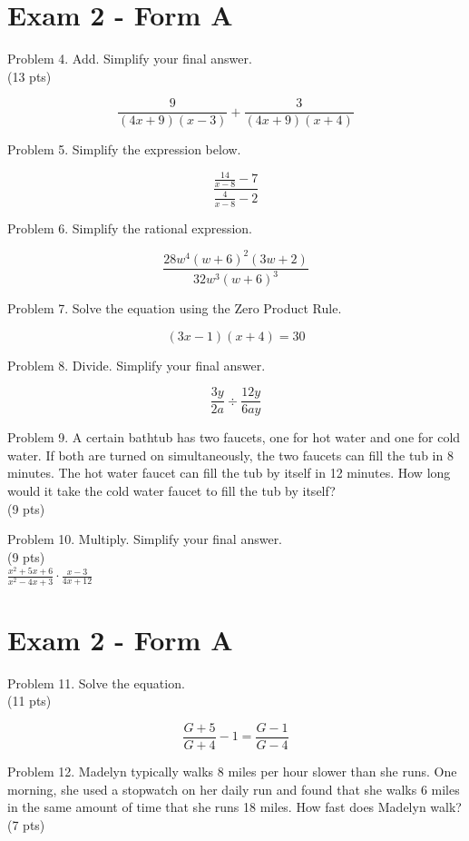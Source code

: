 \documentclass{ximera}
\begin{document}
\section*{Exam 2 - Form A}
Problem 4. Add. Simplify your final answer.\\
(13 pts)

$$\frac{9}{(4 x+9)(x-3)}+\frac{3}{(4 x+9)(x+4)}$$

Problem 5. Simplify the expression below.

$$\frac{\frac{14}{x-8}-7}{\frac{4}{x-8}-2}$$

Problem 6. Simplify the rational expression.

$$\frac{28 w^{4}(w+6)^{2}(3 w+2)}{32 w^{3}(w+6)^{3}}$$

Problem 7. Solve the equation using the Zero Product Rule.

$$(3 x-1)(x+4)=30$$

Problem 8. Divide. Simplify your final answer.

$$\frac{3 y}{2 a} \div \frac{12 y}{6 a y}$$

Problem 9. A certain bathtub has two faucets, one for hot water and one for cold water. If both are turned on simultaneously, the two faucets can fill the tub in 8 minutes. The hot water faucet can fill the tub by itself in 12 minutes. How long would it take the cold water faucet to fill the tub by itself?\\
(9 pts)

Problem 10. Multiply. Simplify your final answer.\\
(9 pts)\\
$\frac{x^{2}+5 x+6}{x^{2}-4 x+3} \cdot \frac{x-3}{4 x+12}$

\section*{Exam 2 - Form A}
Problem 11. Solve the equation.\\
(11 pts)

$$\frac{G+5}{G+4}-1=\frac{G-1}{G-4}$$

Problem 12. Madelyn typically walks 8 miles per hour slower than she runs. One morning, she used a stopwatch on her daily run and found that she walks 6 miles in the same amount of time that she runs 18 miles. How fast does Madelyn walk?\\
(7 pts)
\end{document}
